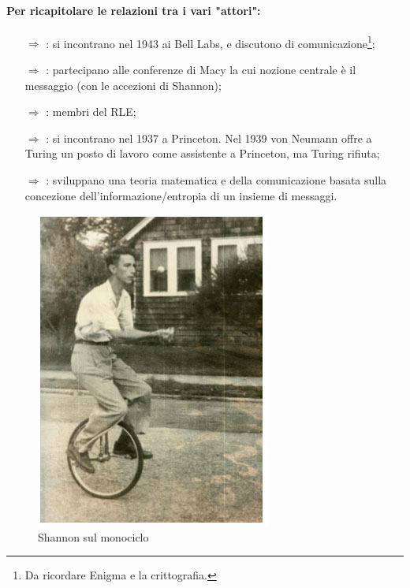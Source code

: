\paragraph{Per ricapitolare le relazioni tra i vari "attori":}

\begin{itemize}
    \item [$\Rightarrow$] : si incontrano nel 1943 ai Bell Labs, e discutono di comunicazione\footnote{Da ricordare Enigma e la crittografia.};
    \item [$\Rightarrow$] : partecipano alle conferenze di Macy la cui nozione centrale è il messaggio (con le accezioni di Shannon);
    \item [$\Rightarrow$] : membri del RLE;
    \item [$\Rightarrow$] : si incontrano nel 1937 a Princeton. Nel 1939 von Neumann offre a Turing un posto di lavoro come assistente a Princeton, ma Turing rifiuta;
    \item [$\Rightarrow$] : sviluppano una teoria matematica e della comunicazione basata sulla concezione dell'informazione/entropia di un insieme di messaggi.
\end{itemize}


\begin{figure}[h]
    \centering
    \includegraphics[scale=0.35]{images/Shannon monocycle.jpg}
    \caption{Shannon sul monociclo}
\end{figure}

